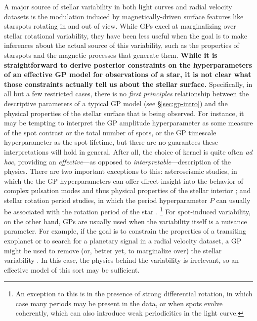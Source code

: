 \documentclass[modern,linenumbers]{aastex62}
\begin{document}
A major source of stellar variability in both light curves and radial velocity
datasets is the modulation induced by magnetically-driven surface features like starspots
rotating in and out of view. While GPs excel at marginalizing over stellar rotational
variability, they have been less useful when the goal is to make
inferences about the actual source of this variability, such as the
properties of starspots and the magnetic processes that generate them.
\textbf{While it is straightforward to derive
    posterior constraints on the hyperparameters of an effective GP model for
    observations of a star, it is not clear what those constraints actually
    tell us about the stellar surface.}
Specifically, in all but a few restricted cases, there is no \emph{first principles}
relationship between the descriptive parameters of a typical GP model
(see \S\ref{sec:gp-intro})
and the physical properties of the stellar surface that is being observed.
%
For instance, it may be tempting to interpret the GP amplitude hyperparameter
as some measure of the spot contrast or the total number of spots,
or the GP timescale hyperparameter as the
spot lifetime, but there are no guarantees these interpretations will
hold in general. After all, the choice of kernel is quite often \emph{ad hoc},
providing an \emph{effective}---as opposed to \emph{interpretable}---description
of the physics.
%
There are two important exceptions to this: asteroseismic studies, in which the
the GP hyperparameters can offer direct insight into
the behavior of complex pulsation modes and thus physical properties of the
stellar interior \citep[e.g.,][]{BrewerStello2009,ForemanMackey2017}; and
stellar rotation period studies, in which the period hyperparameter $P$ can usually
be associated with the rotation period of the star \citep[e.g.,][]{Angus2018}.%
\footnote{An exception to this is in the presence of strong differential
    rotation, in which case many periods may be present in the data, or
    when spots evolve coherently, which can also introduce weak periodicities
    in the light curve.}
%
For spot-induced variability, on the other hand,
GPs are usually used
when the variability itself is a nuisance parameter. For example, if the
goal is to constrain the properties of a transiting exoplanet or to
search for a planetary signal in a radial velocity dataset, a GP might be
used to remove (or, better yet, to marginalize over) the stellar variability
\citep[e.g.,][]{Haywood2014,Rajpaul2015,Luger2017b}.
In this case, the physics behind the variability is irrelevant, so an
effective model of this sort may be sufficient.
\end{document}
